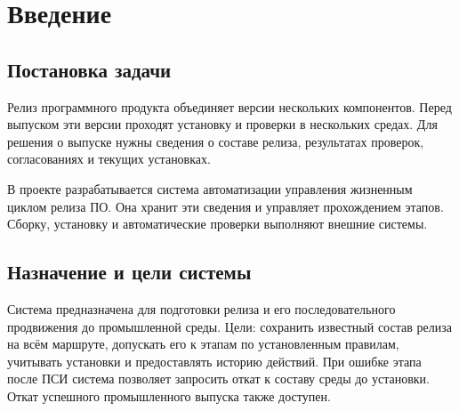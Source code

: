 \documentclass{tpks}
\begin{document}
\makeheader
\begin{changelog}
\end{changelog}

\section{Введение}
\subsection{Постановка задачи}

Релиз программного продукта объединяет версии нескольких компонентов. Перед выпуском
эти версии проходят установку и проверки в нескольких средах. Для решения о выпуске
нужны сведения о составе релиза, результатах проверок, согласованиях и текущих установках.

В проекте разрабатывается система автоматизации управления жизненным циклом релиза ПО. Она хранит эти сведения и управляет прохождением этапов.
Сборку, установку и автоматические проверки выполняют внешние системы.

\subsection{Назначение и цели системы}

Система предназначена для подготовки релиза и его последовательного продвижения до
промышленной среды. Цели: сохранить известный состав релиза на всём маршруте,
допускать его к этапам по установленным правилам, учитывать установки и предоставлять
историю действий. При ошибке этапа после ПСИ система позволяет запросить откат
к составу среды до установки. Откат успешного промышленного выпуска также доступен.
\end{document}
